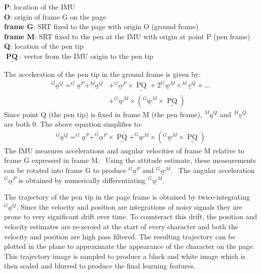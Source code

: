 \documentclass{article}
\newcommand{\nosymbol}{}
\newcommand{\tmop}[1]{\ensuremath{\operatorname{#1}}}
\begin{document}
\textbf{P}: location of the IMU \\
\textbf{O}: origin of frame G on the page \\
\textbf{frame G}: SRT fixed to the page with origin O (ground frame) \\
\textbf{frame M}: SRT fixed to the pen at the IMU with origin at point P (pen frame) \\
\textbf{Q}: location of the pen tip \\
$\underset{\mbox{\textasciitilde}}{\tmop{\textbf{PQ}}}$: vector from the IMU origin to
the pen tip

The acceleration of the pen tip in the ground frame is given by:
\begin{align*}
  ^G \underset{\mbox{\textasciitilde}}{a}^Q =^G
  \underset{\mbox{\textasciitilde}}{a}^P +^M
  \underset{\mbox{\textasciitilde}}{a}^Q &+^G
  \underset{\mbox{\textasciitilde}}{\alpha}^P \times
  \underset{\mbox{\textasciitilde}}{\tmop{PQ}} + 2^G
  \underset{\mbox{\textasciitilde}}{w}^M \times^M
  \underset{\mbox{\textasciitilde}}{v}^Q + ... \\ &+ ^G 
  \underset{\mbox{\textasciitilde}}{w}^M \times \left(^G
  \underset{\mbox{\textasciitilde}}{w}^M \times
  \underset{\mbox{\textasciitilde}}{\tmop{PQ}} \right)
\end{align*}
Since point Q (the pen tip) is fixed in frame M (the pen frame), $^M
\underset{\mbox{\textasciitilde}}{a}^Q$ and $^M
\underset{\mbox{\textasciitilde}}{v}^Q$ are both 0. The above equation simplifies to:
\begin{eqnarray*}
  & ^G \underset{\mbox{\textasciitilde}}{a}^Q =^G
  \underset{\mbox{\textasciitilde}}{a}^P +^G
  \underset{\mbox{\textasciitilde}}{\alpha}^P \times
  \underset{\mbox{\textasciitilde}}{\tmop{PQ}} +^G
  \underset{\mbox{\textasciitilde}}{w}^M \times \left(^G
  \underset{\mbox{\textasciitilde}}{w}^M \times
  \underset{\mbox{\textasciitilde}}{\tmop{PQ}} \right) & 
\end{eqnarray*}
The IMU measures accelerations and angular velocities of frame M relative to frame G expressed in frame M. \ Using the attitude estimate, these measurements can be rotated into frame G to produce $^G
\underset{\mbox{\textasciitilde}}{a}^P$ and $^G
\underset{\mbox{\textasciitilde}}{w}^M \nosymbol$. \ The angular acceleration
$^G \underset{\mbox{\textasciitilde}}{\alpha}^P$ is obtained by numerically
differentiating $^G \underset{\mbox{\textasciitilde}}{w}^M$.

The trajectory of the pen tip in the page frame is obtained by twice-integrating $^G \underset{\mbox{\textasciitilde}}{a}^Q$.
Since the velocity and position are integrations of noisy signals they are prone to very significant drift over time. To counteract this drift, the position and velocity estimates are re-zeroed at the start of every character and both the velocity and position are high pass filtered. The resulting trajectory can be plotted in the plane to approximate the appearance of the character on the page. This trajectory image is sampled to produce a black and white image which is then scaled and blurred to produce the final learning features.
\end{document}
